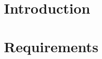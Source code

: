 \documentclass{article}
\begin{document}




\section{Introduction}
\section{Requirements}

\end{document}

